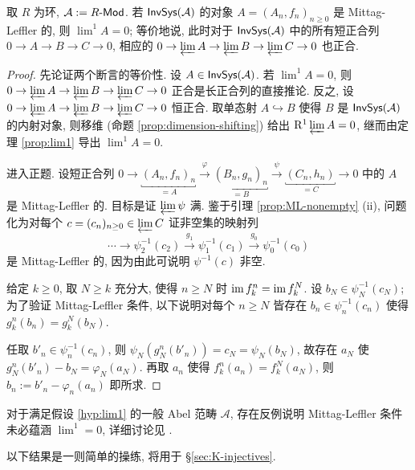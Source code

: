 \begin{proposition}\label{prop:ML-exactness}
	取 $R$ 为环, $\mathcal{A} := R\text{-}\mathsf{Mod}$. 若 $\mathsf{InvSys}(\mathcal{A})$ 的对象 $A = (A_n, f_n)_{n \geq 0}$ 是 Mittag-Leffler 的, 则 $\lim^1 A = 0$; 等价地说, 此时对于 $\mathsf{InvSys}(\mathcal{A})$ 中的所有短正合列 $0 \to A \to B \to C \to 0$, 相应的 $0 \to \varprojlim A \to \varprojlim B \to \varprojlim C \to 0$ 也正合.
\end{proposition}
\begin{proof}
	先论证两个断言的等价性. 设 $A \in \mathsf{InvSys}(\mathcal{A})$. 若 $\lim^1 A = 0$, 则 $0 \to \varprojlim A \to \varprojlim B \to \varprojlim C \to 0$ 正合是长正合列的直接推论. 反之, 设 $0 \to \varprojlim A \to \varprojlim B \to \varprojlim C \to 0$ 恒正合. 取单态射 $A \hookrightarrow B$ 使得 $B$ 是 $\mathsf{InvSys}(\mathcal{A})$ 的内射对象, 则移维 (命题 \ref{prop:dimension-shifting}) 给出 $\mathrm{R}^1 \varprojlim A = 0$, 继而由定理 \ref{prop:lim1} 导出 $\lim^1 A = 0$.
	
	进入正题. 设短正合列 $0 \to \underbracket{(A_n, f_n)_n}_{= A} \xrightarrow{\varphi} \underbracket{(B_n, g_n)_n}_{= B} \xrightarrow{\psi} \underbracket{(C_n, h_n)}_{= C} \to 0$ 中的 $A$ 是 Mittag-Leffler 的. 目标是证 $\varprojlim \psi$ 满. 鉴于引理 \ref{prop:ML-nonempty} (ii), 问题化为对每个 $c = (c_n)_{n \geq 0} \in \varprojlim C$ 证非空集的映射列
	\[ \cdots \to \psi_2^{-1}(c_2) \xrightarrow{g_1} \psi_1^{-1}(c_1) \xrightarrow{g_0} \psi_0^{-1}(c_0) \]
	是 Mittag-Leffler 的, 因为由此可说明 $\psi^{-1}(c)$ 非空.
	
	给定 $k \geq 0$, 取 $N \geq k$ 充分大, 使得 $n \geq N$ 时 $\operatorname{im} f^n_k = \operatorname{im} f^N_k$. 设 $b_N \in \psi_N^{-1}(c_N)$; 为了验证 Mittag-Leffler 条件, 以下说明对每个 $n \geq N$ 皆存在 $b_n \in \psi_n^{-1}(c_n)$ 使得 $g^n_k(b_n) = g^N_k(b_N)$.
	
	任取 $b'_n \in \psi_n^{-1}(c_n)$, 则 $\psi_N\left( g^n_N(b'_n)\right) = c_N = \psi_N\left(b_N \right)$, 故存在 $a_N$ 使 $g^n_N(b'_n) - b_N = \varphi_N(a_N)$. 再取 $a_n$ 使得 $f^n_k(a_n) = f^N_k(a_N)$, 则 $b_n := b'_n - \varphi_n(a_n)$ 即所求.
\end{proof}

对于满足假设 \ref{hyp:lim1} 的一般 Abel 范畴 $\mathcal{A}$, 存在反例说明 Mittag-Leffler 条件未必蕴涵 $\lim^1 = 0$, 详细讨论见 \cite{Roo06}.

以下结果是一则简单的操练, 将用于 \S\ref{sec:K-injectives}.

